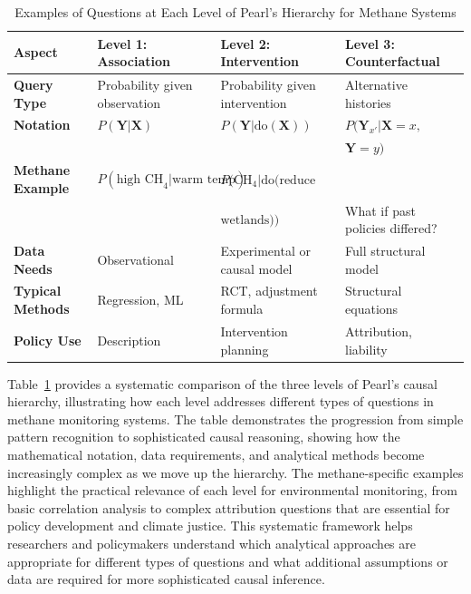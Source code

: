 \begin{table}[H]
	\centering
	\caption[Examples of Questions at Each Level of Pearl's Hierarchy]{Examples of Questions at Each Level of Pearl's Hierarchy for Methane Systems}
	\label{tab:hierarchy_examples}
	\begin{tabular}{>{\raggedright\arraybackslash}p{2.2cm}|>{\raggedright\arraybackslash}p{3.8cm}|>{\raggedright\arraybackslash}p{3.8cm}|>{\raggedright\arraybackslash}p{3.8cm}}
		\hline
		\textbf{Aspect}          & \textbf{Level 1: Association}          & \textbf{Level 2: Intervention}          & \textbf{Level 3: Counterfactual}  \\
		\hline
		\textbf{Query Type}      & Probability given observation          & Probability given intervention          & Alternative histories             \\
		\textbf{Notation}        & $P(\mathbf{Y}|\mathbf{X})$             & $P(\mathbf{Y}|\text{do}(\mathbf{X}))$   & $P(\mathbf{Y}_{x'}|\mathbf{X}=x,$ \\ & & & $\mathbf{Y}=y)$ \\
		\textbf{Methane Example} & $P(\text{high CH}_4|\text{warm temp})$ & $P(\text{CH}_4|\text{do}(\text{reduce}$                                     \\ & & $\text{wetlands}))$ & What if past policies differed? \\
		\textbf{Data Needs}      & Observational                          & Experimental or causal model            & Full structural model             \\
		\textbf{Typical Methods} & Regression, ML                         & RCT, adjustment formula                 & Structural equations              \\
		\textbf{Policy Use}      & Description                            & Intervention planning                   & Attribution, liability            \\
		\hline
	\end{tabular}
\end{table}

Table~\ref{tab:hierarchy_examples} provides a systematic comparison of the three levels of Pearl's causal hierarchy, illustrating how each level addresses different types of questions in methane monitoring systems. The table demonstrates the progression from simple pattern recognition to sophisticated causal reasoning, showing how the mathematical notation, data requirements, and analytical methods become increasingly complex as we move up the hierarchy. The methane-specific examples highlight the practical relevance of each level for environmental monitoring, from basic correlation analysis to complex attribution questions that are essential for policy development and climate justice. This systematic framework helps researchers and policymakers understand which analytical approaches are appropriate for different types of questions and what additional assumptions or data are required for more sophisticated causal inference.

